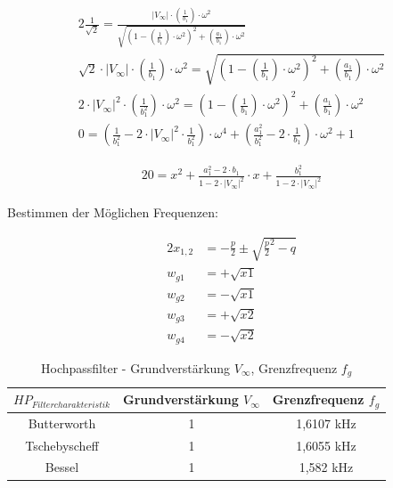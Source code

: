 \begin{alignat}{2}
\frac{1}{\sqrt{2}} = \frac{\lvert V_{\infty} \rvert \cdot \left(\frac{1}{b_{1}} \right) \cdot \omega^2}{\sqrt{\left(1 - \left(\frac{1}{b_{1}} \right) \cdot \omega^2 \right)^2 + \left(\frac{a_{1}}{b_{1}} \right) \cdot \omega^2}}\\
\sqrt{2} \cdot \lvert V_{\infty} \rvert \cdot \left(\frac{1}{b_{1}} \right) \cdot \omega^2 = \sqrt{\left(1 - \left(\frac{1}{b_{1}} \right) \cdot \omega^2 \right)^2 + \left(\frac{a_{1}}{b_{1}} \right) \cdot \omega^2}\\
2 \cdot \lvert V_{\infty} \rvert^2 \cdot \left(\frac{1}{b_{1}^2} \right) \cdot \omega^2 = \left(1 - \left(\frac{1}{b_{1}} \right) \cdot \omega^2 \right)^2 + \left(\frac{a_{1}}{b_{1}} \right) \cdot \omega^2\\
0 = \left( \frac{1}{b_{1}^2} - 2 \cdot \lvert V_{\infty} \rvert^2 \cdot \frac{1}{b_{1}^2} \right) \cdot \omega^4 + \left(\frac{a_{1}^2}{b_{1}^2} - 2 \cdot \frac{1}{b_{1}} \right) \cdot \omega^2 + 1
\end{alignat}




\begin{alignat}{2}
0 = x^2 + \frac{a_{1}^2 - 2 \cdot b_{1}}{1 - 2 \cdot \lvert V_{\infty} \rvert^2} \cdot x + \frac{b_{1}^2}{1 - 2 \cdot \lvert V_{\infty} \rvert^2}
\end{alignat}

\noindent Bestimmen der Möglichen Frequenzen:

\begin{alignat}{2}
x_{1,2} &= -\frac{p}{2} \pm \sqrt{\frac{p}{2}^2 - q}\\
w_{g1} &= +\sqrt{x1}\\
w_{g2} &= -\sqrt{x1}\\
w_{g3} &= +\sqrt{x2}\\
w_{g4} &= -\sqrt{x2}
\end{alignat}

\newpage

\begin{table}[h]
	\centering
	\begin{tabular}{c|c|c}
		$HP_{Filtercharakteristik}$ & Grundverstärkung $V_{\infty}$	& Grenzfrequenz $f_{g}$	\\
		\hline
		\hline
		Butterworth	& 1	& 1,6107 kHz	\\
		Tschebyscheff	& 1	& 1,6055 kHz	\\
		Bessel	& 1	& 1,582 kHz 	\\
	\end{tabular}
	\caption{Hochpassfilter - Grundverstärkung $V_{\infty}$, Grenzfrequenz $f_{g}$ }
	\label{tab:Hochpaesse_Grundverstaerkung}
\end{table}


